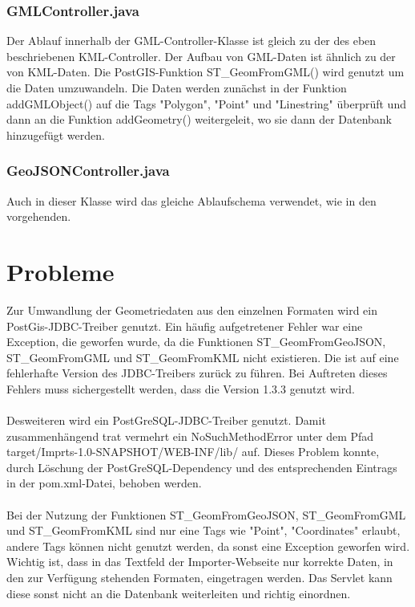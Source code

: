 \documentclass[]{article}
\begin{document}
\subsubsection{GMLController.java}
Der Ablauf innerhalb der GML-Controller-Klasse ist gleich zu der des eben beschriebenen KML-Controller. Der Aufbau von GML-Daten ist ähnlich zu der von KML-Daten. Die PostGIS-Funktion ST\_GeomFromGML() wird genutzt um die Daten umzuwandeln. Die Daten werden zunächst in der Funktion addGMLObject() auf die Tags "Polygon", "Point" und "Linestring" überprüft und dann an die Funktion addGeometry() weitergeleit, wo sie dann der Datenbank hinzugefügt werden.

\subsubsection{GeoJSONController.java}
Auch in dieser Klasse wird das gleiche Ablaufschema verwendet, wie in den vorgehenden.

\section{Probleme}
Zur Umwandlung der Geometriedaten aus den einzelnen Formaten wird ein PostGis-JDBC-Treiber genutzt. Ein häufig aufgetretener Fehler war eine Exception, die geworfen wurde, da die Funktionen ST\_GeomFromGeoJSON, \\ST\_GeomFromGML und ST\_GeomFromKML nicht existieren. Die ist auf eine fehlerhafte Version des JDBC-Treibers zurück zu führen. Bei Auftreten dieses Fehlers muss sichergestellt werden, dass die Version 1.3.3 genutzt wird.\\
\\

Desweiteren wird ein PostGreSQL-JDBC-Treiber genutzt. Damit zusammenhängend trat vermehrt ein NoSuchMethodError unter dem Pfad target/Imprts-1.0-SNAPSHOT/WEB-INF/lib/ auf. Dieses Problem konnte, durch Löschung der PostGreSQL-Dependency und des entsprechenden Eintrags in der pom.xml-Datei, behoben werden.\\
\\

Bei der Nutzung der Funktionen ST\_GeomFromGeoJSON, ST\_GeomFromGML und ST\_GeomFromKML sind nur eine Tags wie "Point", "Coordinates" erlaubt, andere Tags können nicht genutzt werden, da sonst eine Exception geworfen wird. Wichtig ist, dass in das Textfeld der Importer-Webseite nur korrekte Daten, in den zur Verfügung stehenden Formaten, eingetragen werden. Das Servlet kann diese sonst nicht an die Datenbank weiterleiten und richtig einordnen.
\end{document}
